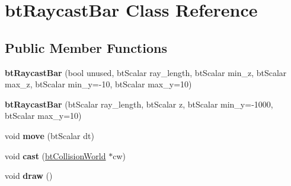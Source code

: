 \hypertarget{classbt_raycast_bar}{\section{bt\+Raycast\+Bar Class Reference}
\label{classbt_raycast_bar}
}
\subsection*{Public Member Functions}
\begin{DoxyCompactItemize}
\item 
\hypertarget{classbt_raycast_bar_ac1c4fc02a346d2f1bb64d1e3c0a9bbac}{{\bfseries bt\+Raycast\+Bar} (bool unused, bt\+Scalar ray\+\_\+length, bt\+Scalar min\+\_\+z, bt\+Scalar max\+\_\+z, bt\+Scalar min\+\_\+y=-\/10, bt\+Scalar max\+\_\+y=10)}\label{classbt_raycast_bar_ac1c4fc02a346d2f1bb64d1e3c0a9bbac}

\item 
\hypertarget{classbt_raycast_bar_a952caf2afa132cae66eb8e52d8a62c57}{{\bfseries bt\+Raycast\+Bar} (bt\+Scalar ray\+\_\+length, bt\+Scalar z, bt\+Scalar min\+\_\+y=-\/1000, bt\+Scalar max\+\_\+y=10)}\label{classbt_raycast_bar_a952caf2afa132cae66eb8e52d8a62c57}

\item 
\hypertarget{classbt_raycast_bar_a84a1205e5edfa9eecb1a861efdeb3efd}{void {\bfseries move} (bt\+Scalar dt)}\label{classbt_raycast_bar_a84a1205e5edfa9eecb1a861efdeb3efd}

\item 
\hypertarget{classbt_raycast_bar_abb517e9235fab2e6010c017652ef7504}{void {\bfseries cast} (\hyperlink{classbt_collision_world}{bt\+Collision\+World} $\ast$cw)}\label{classbt_raycast_bar_abb517e9235fab2e6010c017652ef7504}

\item 
\hypertarget{classbt_raycast_bar_af7d46a2501a9b79a7b2620d1577fad49}{void {\bfseries draw} ()}\label{classbt_raycast_bar_af7d46a2501a9b79a7b2620d1577fad49}

\end{DoxyCompactItemize}
